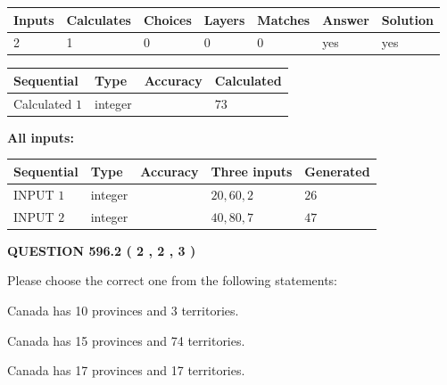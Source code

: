 \documentclass[12pt]{article}
\begin{document}
   
\noindent\begin{tabular}{|l|l|l|l|l|l|l|}
 \hline
Inputs & Calculates & Choices & Layers & Matches & Answer & Solution \\ \hline
 2  & 
 1  & 
 0
  & 
 0  & 
 0  & 
  yes & 
  yes 
  \\ \hline
 \end{tabular}
   
   
   
   
\noindent{}
   
   
  
  
\noindent\begin{tabular}{|l|l|l|l|}
\hline
 Sequential & Type & Accuracy & Calculated \\ 
\hline
 
 
  Calculated $  1 $ & integer &  & 
  $ 73 $ 
 \\  \hline  
 \end{tabular}
   
   
   
   
\noindent\vspace{0.1in}\hspace{-0.08in} {\textbf{\Large{All inputs: }}}
   
   
  
  
\noindent\begin{tabular}{|l|l|l|l|l|}
\hline
 Sequential & Type & Accuracy & Three inputs & Generated \\ 
\hline
 
 
  INPUT $  1 $ & integer &  & $
 20
 , 
 60
 , 
 2
 $ & $ 26 $ 
 \\  \hline  
 
 
  INPUT $  2 $ & integer &  & $
 40
 , 
 80
 , 
 7
 $ & $ 47 $ 
 \\  \hline  
 \end{tabular}
   
   
  
\vspace{0.2in}
  
{\textbf{\Large{QUESTION
596.2 
 ( 2 , 2 , 3 )
}}}
  
  
Please choose the correct one from the following statements:
 
 
Canada has 10  provinces and 3 territories.
 
 
Canada has  15 provinces and  74 territories.
 
 
Canada has  17 provinces and  17 territories.
 
\end{document}

